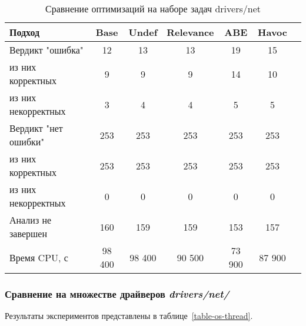 \begin{center}
  \begin{table}[h]\footnotesize \centering
  	\label{table-drivers-opt}
    \caption{Сравнение оптимизаций на наборе задач drivers/net}
    \begin{tabular}{ | l | c | c | c | c | c | c |}
      \hline
      Подход         				& Base 		& Undef		& Relevance & ABE 		& Havoc   	\\ \hline
      Вердикт "ошибка" 				& 12  		& 13   		& 13       	& 19   		& 15     	\\ 
  \hspace{0.5cm} из них корректных 	& 9 		& 9 		& 9     	& 14   		& 10     	\\ 
  \hspace{0.5cm} из них некорректных & 3 		& 4 		& 4     	& 5  		& 5      	\\ \hline
      Вердикт "нет ошибки"  		& 253    	& 253    	& 253     	& 253   	& 253    	\\ 
  \hspace{0.5cm} из них корректных 	& 253 		& 253    	& 253       & 253   	& 253    	\\
  \hspace{0.5cm} из них некорректных & 0 		& 0    		& 0      	& 0   		& 0     	\\ \hline
      Анализ не завершен       		& 160    	& 159    	& 159     	& 153   	& 157    	\\ \hline
      Время CPU, с   				& 98 400 	& 98 400 	& 90 500  	& 73 900   	& 87 900    \\ 
      \hline
    \end{tabular}
  \end{table}
\end{center}



\subsubsection{Сравнение на множестве драйверов \textit{drivers/net/}}
Результаты экспериментов представлены в таблице~\ref{table-os-thread}.

